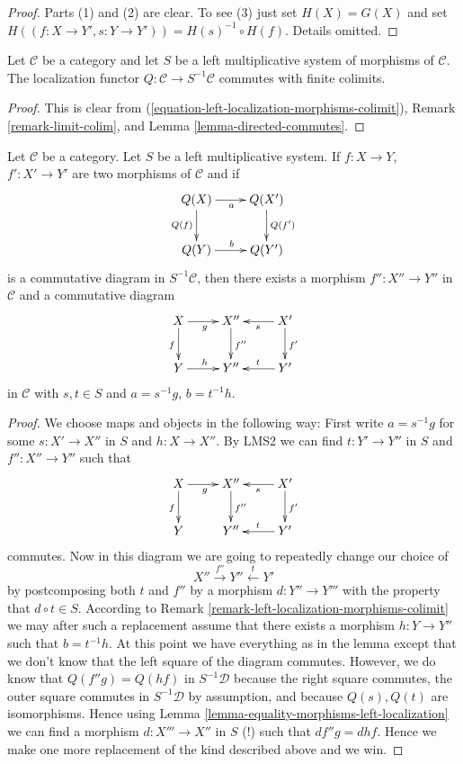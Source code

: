 \begin{proof}
Parts (1) and (2) are clear. To see (3) just set $H(X) = G(X)$
and set $H((f : X \to Y', s : Y \to Y')) = H(s)^{-1} \circ H(f)$.
Details omitted.
\end{proof}

\begin{lemma}
\label{lemma-left-localization-limits}
Let $\mathcal{C}$ be a category and let $S$ be a left multiplicative
system of morphisms of $\mathcal{C}$. The localization functor
$Q : \mathcal{C} \to S^{-1}\mathcal{C}$ commutes with finite colimits.
\end{lemma}

\begin{proof}
This is clear from (\ref{equation-left-localization-morphisms-colimit}),
Remark \ref{remark-limit-colim}, and
Lemma \ref{lemma-directed-commutes}.
\end{proof}

\begin{lemma}
\label{lemma-left-localization-diagram}
Let $\mathcal{C}$ be a category. Let $S$ be a left multiplicative
system. If $f : X \to Y$, $f' : X' \to Y'$ are two morphisms of
$\mathcal{C}$ and if
$$
\xymatrix{
Q(X) \ar[d]_{Q(f)} \ar[r]_a & Q(X') \ar[d]^{Q(f')} \\
Q(Y) \ar[r]^b & Q(Y')
}
$$
is a commutative diagram in $S^{-1}\mathcal{C}$, then there exists
a morphism $f'' : X'' \to Y''$ in $\mathcal{C}$ and a commutative
diagram
$$
\xymatrix{
X \ar[d]_f \ar[r]_g & X'' \ar[d]^{f''} & X' \ar[d]^{f'} \ar[l]^s \\
Y \ar[r]^h & Y'' & Y' \ar[l]_t
}
$$
in $\mathcal{C}$ with $s, t \in S$ and $a = s^{-1}g$, $b = t^{-1}h$.
\end{lemma}

\begin{proof}
We choose maps and objects in the following way:
First write $a = s^{-1}g$ for some $s : X' \to X''$ in $S$ and
$h : X \to X''$. By LMS2 we can find $t : Y' \to Y''$ in $S$ and
$f'' : X'' \to Y''$ such that
$$
\xymatrix{
X \ar[d]_f \ar[r]_g & X'' \ar[d]^{f''} & X' \ar[d]^{f'} \ar[l]^s \\
Y & Y'' & Y' \ar[l]_t
}
$$
commutes. Now in this diagram we are going to repeatedly change our
choice of
$$
X'' \xrightarrow{f''} Y'' \xleftarrow{t} Y'
$$
by postcomposing both $t$ and $f''$ by a morphism $d : Y'' \to Y'''$
with the property that $d \circ t \in S$. According to
Remark \ref{remark-left-localization-morphisms-colimit}
we may after such a replacement assume that there exists a morphism
$h : Y \to Y''$ such that $b = t^{-1}h$. At this point we have everything
as in the lemma except that we don't know that the left square of the
diagram commutes. However, we do know that $Q(f''g) = Q(hf)$ in
$S^{-1}\mathcal{D}$ because the right square commutes,
the outer square commutes in $S^{-1}\mathcal{D}$ by assumption, and
because $Q(s), Q(t)$ are isomorphisms. Hence using
Lemma \ref{lemma-equality-morphisms-left-localization}
we can find a morphism $d : X''' \to X''$ in $S$ (!) such that
$df''g = dhf$. Hence we make one more replacement of the kind described
above and we win.
\end{proof}

